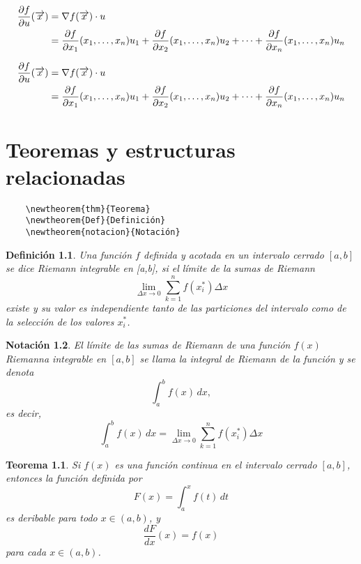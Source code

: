 \documentclass[12pt]{book}
\newcounter{Teorema}
\numberwithin{equation}{section}
\theoremstyle{plain}  %
\newtheorem{thm}{Teorema}[section]
\newtheorem{Def}{Definición}[chapter]
\newtheorem{notacion}[Def]{Notación}
\begin{document}
\begin{align}
\parcial{f}{u}(\overrightarrow{x})&=\nabla f(\overrightarrow{x})\cdot u \\ 
&=\parcial{f}{x_1}(x_1,\ldots,x_n)u_1+\parcial{f}{x_2}(x_1,\ldots,x_n)u_2+\cdots+\parcial{f}{x_n}(x_1,\ldots,x_n)u_n \raisetag{-0.1cm}
\end{align}

\begin{align}
	\frac{\partial f}{\partial u}(\overrightarrow{x})&=\nabla f(\overrightarrow{x})\cdot u \\ 
	&=\frac{\partial f}{\partial x_1}(x_1,\ldots,x_n)u_1+\frac{\partial f}{\partial x_2}(x_1,\ldots,x_n)u_2+\cdots+\frac{\partial f}{\partial x_n}(x_1,\ldots,x_n)u_n 
\end{align}


\chapter{Teoremas y estructuras relacionadas}


\begin{verbatim}
	\newtheorem{thm}{Teorema}
	\newtheorem{Def}{Definición}
	\newtheorem{notacion}{Notación}
\end{verbatim}

\begin{Def}
	Una función $f$ definida y acotada en un intervalo cerrado $[a,b]$ se dice Riemann integrable en [a,b], si el límite de la sumas de Riemann
	\begin{equation}
		\lim\limits_{\Delta x\to 0}\sum\limits_{k=1}^{n}f(x_i^{*})\Delta x
	\end{equation}
existe y su valor es independiente tanto de las particiones del intervalo como de la selección de  los valores $x_i^{*}$.
\end{Def}


\begin{notacion}
El límite de las sumas de Riemann de  una función $f(x)$ Riemanna integrable en $[a,b]$ se llama la integral de Riemann de la función y se denota 
\begin{equation*}
	\int_{a}^{b}f(x)\, dx,
\end{equation*}
es decir,
\begin{equation*}
	\int_{a}^{b}f(x)\, dx=	\lim\limits_{\Delta x\to 0}\sum\limits_{k=1}^{n}f(x_i^{*})\Delta x
\end{equation*}
\end{notacion}

\begin{thm}\label{thm21}
	Si $f(x)$ es una función continua en el intervalo cerrado $[a,b]$, entonces la función definida por 
	\begin{equation*}
		F(x)=\int_{a}^{x}f(t)\, dt
	\end{equation*}
es deribable para todo $x\in(a,b)$, y 
\begin{equation*}
	\frac{dF}{dx}(x)=f(x)
\end{equation*}
para cada $x\in(a,b)$.
\end{thm}
\end{document}
